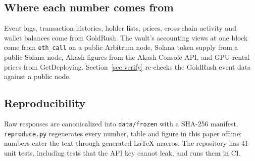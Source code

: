 \subsection{Where each number comes from}
Event logs, transaction histories, holder lists, prices, cross-chain activity and wallet balances come from GoldRush. The vault's accounting views at one block come from \texttt{eth\_call} on a public Arbitrum node, Solana token supply from a public Solana node, Akash figures from the Akash Console API, and GPU rental prices from GetDeploying. Section~\ref{sec:verify} re-checks the GoldRush event data against a public node.

\subsection{Reproducibility}
Raw responses are canonicalized into \texttt{data/frozen} with a SHA-256 manifest. \texttt{reproduce.py} regenerates every number, table and figure in this paper offline; numbers enter the text through generated \LaTeX{} macros. The repository has 41 unit tests, including tests that the API key cannot leak, and runs them in CI.
